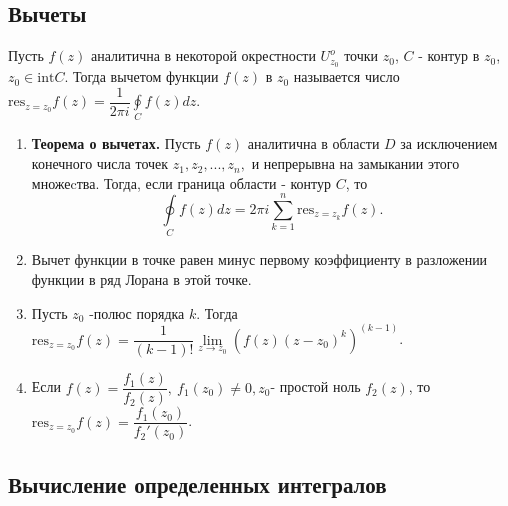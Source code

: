 \documentclass[a4paper,12pt]{scrartcl}
\DeclareMathOperator{\bbc}{\mathbb{C}}
\newcommand{\res}{\text{res}}
\begin{document}

\subsection{Вычеты}
Пусть $f(z)$ аналитична в некоторой окрестности $U_{z_0}^{o}$ точки $z_0$, $C$ - контур в $z_0$, $z_0\in \text{int} C$. Тогда вычетом функции $f(z)$ в $z_0$ называется число $\res_{z = z_0}f(z) = \dfrac{1}{2\pi i}\oint\limits_{C}f(z)dz$. 
\begin{enumerate}
\item\textbf{Теорема о вычетах.} Пусть $f(z)$ аналитична в области $D$ за исключением конечного числа точек $z_1,z_2,...,z_n,$ и непрерывна на замыкании этого множеcтва. Тогда, если граница области  - контур $C$, то
$$\oint\limits_{C}f(z)dz = 2\pi i\sum\limits_{k=1}^{n}\res_{z = z_k}f(z).$$

\item Вычет функции в точке равен минус первому коэффициенту в разложении функции в ряд Лорана в этой точке.
\item Пусть $z_0$ -полюс порядка $k$. Тогда $\res_{z = z_0}f(z) = \dfrac{1}{(k-1)!}\lim\limits_{z\to z_0}(f(z)(z-z_0)^k)^{(k-1)}$.
\item Если $f(z) = \dfrac{f_1(z)}{f_2(z)},\ f_1(z_0) \neq 0, z_0$- простой ноль $f_2(z)$, то $\res_{z = z_0}f(z) = \dfrac{f_1(z_0)}{f_2'(z_0)}$.
\end{enumerate}
\subsection{Вычисление определенных интегралов}
\end{document}
